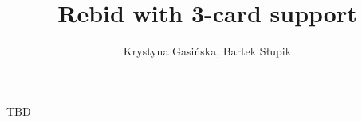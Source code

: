 \documentclass[12pt, a4paper]{article}
\title{Rebid with 3-card support}
\author{Krystyna Gasińska, Bartek Słupik}
\begin{document}
\maketitle


TBD

\end{document}
